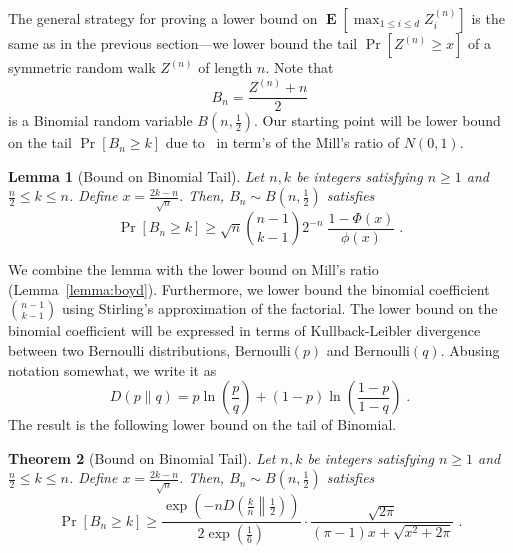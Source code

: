 \documentclass{article}
\DeclareMathOperator*{\Exp}{\mathbf{E}}
\newtheorem{theorem}{Theorem}
\newtheorem{lemma}[theorem]{Lemma}
\begin{document}
The general strategy for proving a lower bound on $\Exp\left[\max_{1 \le i \le d} Z^{(n)}_i \right]$ is the same
as in the previous section---we lower bound the tail $\Pr[Z^{(n)} \ge x]$ of a symmetric random walk $Z^{(n)}$ of length $n$.
Note that
$$
B_n = \frac{Z^{(n)} + n}{2}
$$
is a Binomial random variable $B(n,\frac{1}{2})$. Our starting point will be lower bound on the tail $\Pr[B_n \ge k]$
due to~\citet[Theorem 2]{McKay1989} in term's of the Mill's ratio of $N(0,1)$.

\begin{lemma}[Bound on Binomial Tail]
\label{lemma:mckay}
Let $n,k$ be integers satisfying $n \ge 1$ and $\frac{n}{2} \le k \le n$. Define $x = \frac{2k - n}{\sqrt{n}}$. Then, $B_n \sim B(n,\frac{1}{2})$ satisfies
$$
\Pr \left[ B_n \ge  k \right]
 \ge \sqrt{n} \binom{n-1}{k-1} 2^{-n} \; \frac{1 - \Phi(x)}{\phi(x)} \; .
$$
\end{lemma}

We combine the lemma with the lower bound on Mill's ratio
(Lemma~\ref{lemma:boyd}). Furthermore, we lower bound the binomial coefficient
$\binom{n-1}{k-1}$ using Stirling's approximation of the factorial. The lower
bound on the binomial coefficient will be expressed in terms of
Kullback-Leibler divergence between two Bernoulli distributions,
$\text{Bernoulli}(p)$ and $\text{Bernoulli}(q)$. Abusing notation somewhat,
we write it as
$$
D(p\|q) = p \ln \left( \frac{p}{q} \right) + (1-p) \ln \left( \frac{1-p}{1-q} \right) \; .
$$
The result is the following lower bound on the tail of Binomial.

\begin{theorem}[Bound on Binomial Tail]
\label{theorem:binomial}
Let $n,k$ be integers satisfying $n \ge 1$ and $\frac{n}{2} \le k \le n$. Define $x = \frac{2k - n}{\sqrt{n}}$. Then, $B_n \sim B(n,\frac{1}{2})$ satisfies
$$
\Pr \left[ B_n \ge  k \right] \ge \frac{\exp\left(-n D \left(\frac{k}{n} \middle\| \frac{1}{2} \right)\right)}{2 \exp\left(\frac{1}{6}\right)} \cdot \frac{\sqrt{2\pi}}{(\pi-1)x+\sqrt{x^2+2 \pi}} \; .
$$
\end{theorem}
\end{document}
